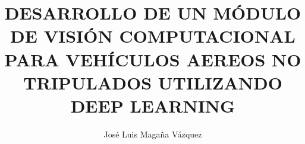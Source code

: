 \documentclass[holdfloat]{MSC-TESO-01}
\begin{document}
\sloppy
\setlength{\baselineskip}{1\baselineskip}
\author{José Luis Magaña Vázquez}
\title{DESARROLLO DE UN MÓDULO DE VISIÓN COMPUTACIONAL PARA VEHÍCULOS AEREOS NO TRIPULADOS UTILIZANDO DEEP LEARNING}
\maketitle

%  
%
%
%
%
%


\setcounter{secnumdepth}{2} %
\setcounter{tocdepth}{2}    %
\tableofcontents            %


\listoffigures	%

\listoftables  %


\mainmatterSU




%
%
%


\end{document}

